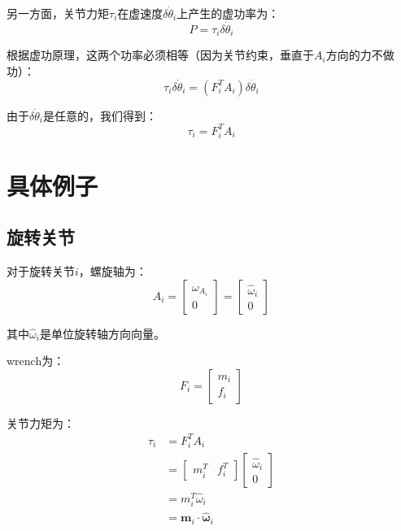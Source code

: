 \documentclass[12pt,a4paper]{article}
\begin{document}
另一方面，关节力矩$\tau_i$在虚速度$\delta \dot{\theta}_i$上产生的虚功率为：
\begin{equation}
P = \tau_i \delta \dot{\theta}_i
\end{equation}

根据虚功原理，这两个功率必须相等（因为关节约束，垂直于$A_i$方向的力不做功）：
\begin{equation}
\tau_i \delta \dot{\theta}_i = (F_i^T A_i) \delta \dot{\theta}_i
\end{equation}

由于$\delta \dot{\theta}_i$是任意的，我们得到：
\begin{equation}
\tau_i = F_i^T A_i
\label{eq:virtual_work}
\end{equation}

\section{具体例子}

\subsection{旋转关节}

对于旋转关节$i$，螺旋轴为：
\begin{equation}
A_i = \begin{bmatrix}
\omega_{A_i} \\
0
\end{bmatrix} = \begin{bmatrix}
\hat{\omega}_i \\
0
\end{bmatrix}
\end{equation}

其中$\hat{\omega}_i$是单位旋转轴方向向量。

wrench为：
\begin{equation}
F_i = \begin{bmatrix}
m_i \\
f_i
\end{bmatrix}
\end{equation}

关节力矩为：
\begin{align}
\tau_i &= F_i^T A_i \\
&= \begin{bmatrix} m_i^T & f_i^T \end{bmatrix} \begin{bmatrix} \hat{\omega}_i \\ 0 \end{bmatrix} \\
&= m_i^T \hat{\omega}_i \\
&= \bm{m}_i \cdot \hat{\bm{\omega}}_i
\end{align}
\end{document}
